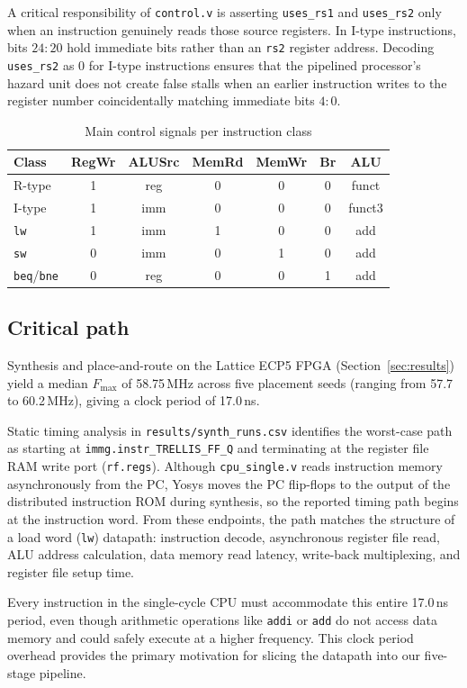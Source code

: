 A critical responsibility of \texttt{control.v} is asserting \texttt{uses\_rs1}
and \texttt{uses\_rs2} only when an instruction genuinely reads those source
registers. In I-type instructions, bits $24:20$ hold immediate bits rather than
an \texttt{rs2} register address. Decoding \texttt{uses\_rs2} as 0 for I-type
instructions ensures that the pipelined processor's hazard unit does not create
false stalls when an earlier instruction writes to the register number
coincidentally matching immediate bits $4:0$.

\begin{table}[t]
\centering
\caption{Main control signals per instruction class}
\label{tab:control}
\small
\setlength{\tabcolsep}{3pt}
\begin{tabular}{@{}lcccccc@{}}
\toprule
Class & RegWr & ALUSrc & MemRd & MemWr & Br & ALU \\
\midrule
R-type & 1 & reg & 0 & 0 & 0 & funct \\
I-type & 1 & imm & 0 & 0 & 0 & funct3 \\
\texttt{lw} & 1 & imm & 1 & 0 & 0 & add \\
\texttt{sw} & 0 & imm & 0 & 1 & 0 & add \\
\texttt{beq}/\texttt{bne} & 0 & reg & 0 & 0 & 1 & add \\
\bottomrule
\end{tabular}
\end{table}

\subsection{Critical path}
Synthesis and place-and-route on the Lattice ECP5 FPGA
(Section~\ref{sec:results}) yield a median $F_{\max}$ of 58.75\,MHz across
five placement seeds (ranging from 57.7 to 60.2\,MHz), giving a clock period of
17.0\,ns.

Static timing analysis in \texttt{results/synth\_runs.csv} identifies the
worst-case path as starting at \texttt{immg.instr\_TRELLIS\_FF\_Q} and
terminating at the register file RAM write port (\texttt{rf.regs}). Although
\texttt{cpu\_single.v} reads instruction memory asynchronously from the PC,
Yosys moves the PC flip-flops to the output of the distributed instruction ROM
during synthesis, so the reported timing path begins at the instruction word.
From these endpoints, the path matches the structure of a load word
(\texttt{lw}) datapath: instruction decode, asynchronous register file read,
ALU address calculation, data memory read latency, write-back multiplexing,
and register file setup time.

Every instruction in the single-cycle CPU must accommodate this entire 17.0\,ns
period, even though arithmetic operations like \texttt{addi} or \texttt{add} do
not access data memory and could safely execute at a higher frequency. This clock
period overhead provides the primary motivation for slicing the datapath
into our five-stage pipeline.
